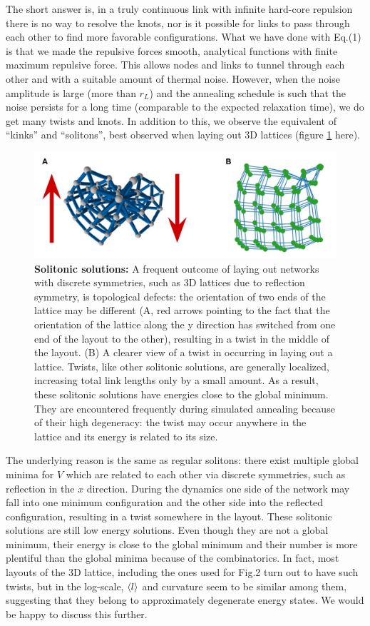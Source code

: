 \documentclass[11pt]{article}
\begin{document}
\begin{response}
The short answer is, in a truly continuous link with infinite hard-core repulsion there is no way to resolve the knots, nor is it possible for links to pass through each other to find more favorable configurations. 
What we have done with Eq.(1) is that we made the repulsive forces smooth, analytical functions with finite maximum repulsive force. 
This allows nodes and links to tunnel through each other and with a suitable amount of thermal noise.
However, when the noise amplitude is large (more than $r_L$) and the annealing schedule is such that the noise persists for a long time (comparable to the expected relaxation time), we do get many twists and knots. 
In addition to this, we observe the equivalent of ``kinks'' and ``solitons'', best observed when laying out 3D lattices (figure \ref{fig:twist} here).
\begin{figure}[ht]
    \centering
    \includegraphics[width=.8\textwidth]{fig-09-19/3D-twist.pdf}
    \caption{{\bf Solitonic solutions:} A frequent outcome of laying out networks with discrete symmetries, such as 3D lattices due to reflection symmetry, is topological defects: the orientation of two ends of the lattice may be different (A, red arrows pointing to the fact that the orientation of the lattice along the y direction has switched from one end of the layout to the other), resulting in a twist in the middle of the layout. 
    (B) A clearer view of a twist in occurring in laying out a lattice. 
    Twists, like other solitonic solutions, are generally localized, increasing total link lengths only by a small amount. 
    As a result, these solitonic solutions have energies close to the global minimum.
    They are encountered frequently during simulated annealing because of their high degeneracy: the twist may occur anywhere in the lattice and its energy is related to its size. 
    }
    \label{fig:twist}
\end{figure}
The underlying reason is the same as regular solitons: there exist multiple global minima for $V$ which are related to each other via discrete symmetries, such as reflection in the $x$ direction. 
During the dynamics one side of the network may fall into one minimum configuration and the other side into the reflected configuration, resulting in a twist somewhere in the layout. 
These solitonic solutions are still low energy solutions. 
Even though they are not a global minimum, their energy is close to the global minimum and their number is more plentiful than the global minima because of the combinatorics. 
In fact, most layouts of the 3D lattice, including the ones used for Fig.2 turn out to have such twists, but in the log-scale, $\left<l\right>$ and curvature seem to be similar among them, suggesting that they belong to approximately degenerate energy states. 
We would be happy to discuss this further. 

\end{response}
\end{document}

